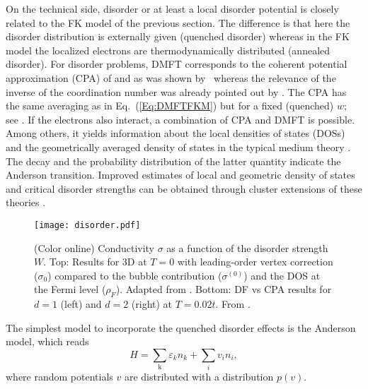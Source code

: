 \documentclass[rmp,aps,reprint,amsmath,amssymb,superscriptaddress,showpacs,nofootinbib]{revtex4-1}
\begin{document}
On the technical side, disorder or at least a local disorder potential is closely related to the FK model of the previous section. The difference is that here the disorder distribution is externally given (quenched disorder) whereas in the FK model the localized electrons are thermodynamically distributed (annealed disorder). For disorder problems, DMFT  corresponds to the coherent potential approximation (CPA) of   and  as was  shown by~ whereas the relevance of the inverse of the coordination number was already pointed out by . The CPA has the same averaging as in Eq.\ (\ref{Eq:DMFTFKM}) but for a fixed (quenched) $w$; see . If the electrons also interact, a combination of CPA and DMFT is possible. Among others, it yields information about the local densities of states (DOSs) \cite{Byczuk2009} and the geometrically averaged density of states in the typical medium theory \cite{Dobrosavljevic2003}. The decay and the probability distribution of the latter quantity indicate the Anderson transition. Improved estimates of local and geometric density of states and critical disorder strengths can be obtained through cluster extensions of these theories \cite{Jarrell2001a,Terletska2014,Ekuma2014a}.

\begin{figure}[t]
\begin{center}
  \texttt{[image: disorder.pdf]}
\end{center}
    \caption{(Color online) Conductivity $\sigma$ as a function of the disorder strength $W$. Top: Results for 3D  at $T=0$ with leading-order vertex correction ($\sigma_0$) compared to the bubble contribution ($\sigma^{(0)}$) and the DOS at the Fermi level  ($\rho_F$). Adapted from . Bottom: DF vs CPA results for $d=1$ (left) and $d=2$ (right) at $T=0.02t$. From .}
  \label{Results_Disorder:Terletska2013_fig4}
\end{figure}

The simplest model to incorporate the quenched disorder effects is the Anderson model, which reads
\begin{equation}
\label{eq:anderson_ins}
  H = \sum_{\mathrm{k}} \varepsilon_k  n_k + \sum_i {v_i n_i},
\end{equation}
where random potentials $v$ are distributed with a distribution $p(v)$. 
\end{document}
